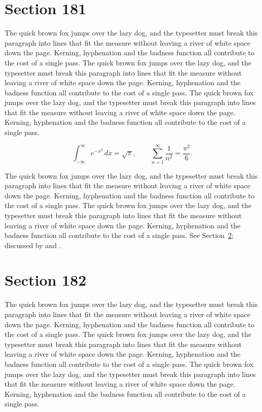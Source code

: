 \documentclass{article}
\begin{document}
\section{Section 181}
\label{sec:181}
The quick brown fox jumps over the lazy dog, and the typesetter must break this paragraph into lines that fit the measure without leaving a river of white space down the page. Kerning, hyphenation and the badness function all contribute to the cost of a single pass. The quick brown fox jumps over the lazy dog, and the typesetter must break this paragraph into lines that fit the measure without leaving a river of white space down the page. Kerning, hyphenation and the badness function all contribute to the cost of a single pass. The quick brown fox jumps over the lazy dog, and the typesetter must break this paragraph into lines that fit the measure without leaving a river of white space down the page. Kerning, hyphenation and the badness function all contribute to the cost of a single pass. 

\begin{equation}\label{eq:181}
\int_{-\infty}^{\infty} e^{-x^{2}}\,dx = \sqrt{\pi}, \qquad
\sum_{n=1}^{\infty} \frac{1}{n^{2}} = \frac{\pi^{2}}{6}.
\end{equation}

The quick brown fox jumps over the lazy dog, and the typesetter must break this paragraph into lines that fit the measure without leaving a river of white space down the page. Kerning, hyphenation and the badness function all contribute to the cost of a single pass. The quick brown fox jumps over the lazy dog, and the typesetter must break this paragraph into lines that fit the measure without leaving a river of white space down the page. Kerning, hyphenation and the badness function all contribute to the cost of a single pass. 
See Section~\ref{sec:182}; discussed by \textcite{k2} and \textcite{l4}.
\section{Section 182}
\label{sec:182}
The quick brown fox jumps over the lazy dog, and the typesetter must break this paragraph into lines that fit the measure without leaving a river of white space down the page. Kerning, hyphenation and the badness function all contribute to the cost of a single pass. The quick brown fox jumps over the lazy dog, and the typesetter must break this paragraph into lines that fit the measure without leaving a river of white space down the page. Kerning, hyphenation and the badness function all contribute to the cost of a single pass. The quick brown fox jumps over the lazy dog, and the typesetter must break this paragraph into lines that fit the measure without leaving a river of white space down the page. Kerning, hyphenation and the badness function all contribute to the cost of a single pass. 
\end{document}
